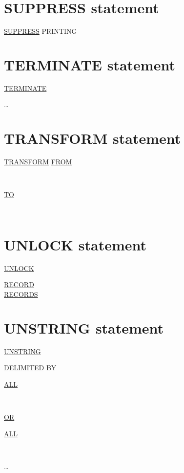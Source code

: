 \documentclass[a4paper,oneside,svgnames]{scrbook}
\makeatletter
\newcommand{\key}[1]{\underline{#1}}
\newcommand{\deleted}[1]{%
  \colorbox{red!75}{#1}}
\newcommand{\pending}[1]{%
  \textcolor{gray!75}{#1}}
\newenvironment{0-1}{$\left[ \begin{tabular}{@{}l@{}}}{\end{tabular} \right]$}
\newenvironment{1=}{$\left\{ \begin{tabular}{@{}l@{}}}{\end{tabular} \right\}$}
\makeatother
\begin{document}
\section{SUPPRESS statement}

\pending{
  \key{SUPPRESS} PRINTING
}

\section{TERMINATE statement}

\pending{
  \key{TERMINATE}
  \begin{1=}
    \reportname
  \end{1=} \ldots
}

\section{TRANSFORM statement}

\deleted{
  \key{TRANSFORM} \identifier \key{FROM}
  \begin{1=}
    \identifier \\
    \literal
  \end{1=}
  \key{TO}
  \begin{1=}
    \identifier \\
    \literal
  \end{1=}
}

\section{UNLOCK statement}

\key{UNLOCK} \filename
\begin{0-1}
  \key{RECORD} \\
  \key{RECORDS}
\end{0-1}

\section{UNSTRING statement}

\key{UNSTRING} \identifier

\begin{0-1}
  \key{DELIMITED} BY
  \begin{0-1}
    \key{ALL}
  \end{0-1}
  \begin{1=}
    \identifier \\
    \literal
  \end{1=}
  \begin{1=}
    \key{OR}
    \begin{0-1}
      \key{ALL}
    \end{0-1}
    \begin{1=}
      \identifier \\
      \literal
    \end{1=}
  \end{1=} \ldots
\end{0-1}
\end{document}
